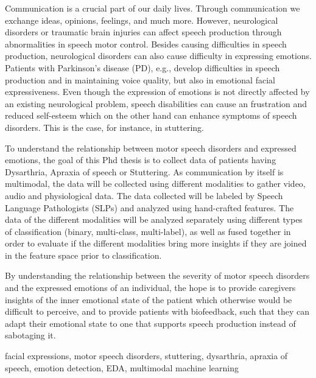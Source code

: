 

Communication is a crucial part of our daily lives. Through communication we exchange ideas, opinions, feelings, and much more.
However, neurological disorders or traumatic brain injuries can affect speech production through abnormalities in speech motor control.
Besides causing difficulties in speech production, neurological disorders can also cause difficulty in expressing emotions. Patients with
Parkinson’s disease (PD), e.g., develop difficulties in speech production and in maintaining voice quality, but also in emotional facial
expressiveness.
Even though the expression of emotions is not directly affected by an existing neurological problem, speech disabilities can cause an
frustration and reduced self-esteem which on the other hand can enhance symptoms of speech disorders. This is the case, for instance,
in stuttering.

To understand the relationship between motor speech disorders and expressed emotions, the goal of this Phd thesis is to collect data of patients having Dysarthria, Apraxia of speech or Stuttering. As communication by itself is multimodal, the data will be collected using different modalities to gather video, audio and physiological data.
The data collected will be labeled by Speech Language Pathologists (SLPs) and analyzed using hand-crafted features. The data of the
different modalities will be analyzed separately using different types of classification (binary, multi-class, multi-label), as well as fused
together in order to evaluate if the different modalities bring more insights if they are joined in the feature space prior to classification.

By understanding the relationship between the severity of motor speech disorders and the expressed emotions of an individual, the
hope is to provide caregivers insights of the inner emotional state of the patient which otherwise would be difficult to perceive, and to
provide patients with biofeedback, such that they can adapt their emotional state to one that supports speech production instead of
sabotaging it.


\begin{keywords}
facial expressions, motor speech disorders, stuttering, dysarthria, apraxia of speech, emotion detection, EDA, multimodal machine learning 
\end{keywords} 



\begin{comment}
The abstract should not exceed one page and should answer the following questions:

\begin{itemize}
	\item What's the problem?
	\item Why is it interesting?
	\item What's the solution?
	\item What follows from the solution?
\end{itemize}
\end{comment}